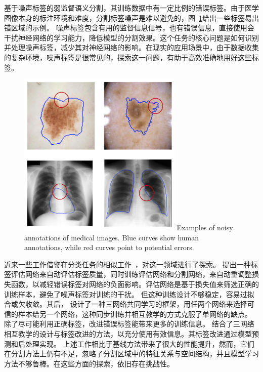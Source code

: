 基于噪声标签的弱监督语义分割，其训练数据中有一定比例的错误标签。由于医学图像本身的标注环境和难度，分割标签噪声是难以避免的，图~\ref{c1_fig3}给出一些标签易出错区域的示例。
噪声标签包含有用的监督信息信号，也有错误信息，直接使用会干扰神经网络的学习能力，降低模型的分割效果。这个任务的核心问题是如何识别并处理噪声标签，减少其对神经网络的影响。在现实的应用场景中，由于数据收集的复杂环境，噪声标签是很常见的，探索这一问题，有助于高效准确地用好这些标签。
    \begin{figure}[tbp]
        \centering 
        \includegraphics[width=0.7\textwidth]{img/c1/intro_3.png}
        {Examples of noisy annotations of medical images. Blue curves show human annotations, while red curves point to potential errors.}
        \label{c1_fig3}
    \end{figure}

近来一些工作借鉴在分类任务的相似工作~\citep{arpit2017closer,Han2018CoteachingRT,Wei2020CombatingNL}，对这一领域进行了探索。
\citet{Zhu2019PickandLearnAQ} 提出一种标签评估网络来自动评估标签质量，同时训练评估网络和分割网络，来自动重调整损失函数，以减轻错误标签对网络的负面影响。评估网络是基于损失值来筛选正确的训练样本，避免了噪声标签对训练的干扰。
但这种训练设计不够稳定，容易过拟合或欠收敛。其后，\citet{Zhang2020RobustMI} 设计了一种三网络共同学习的框架，用任两个网络来选择可信的样本给另一个网络，这种同步训练并相互教学的方式克服了单网络的缺点。
除了尽可能利用正确标签，改进错误标签能带来更多的训练信息。\citet{Xue2020CascadedRL} 结合了三网络相互教学的设计与标签改进的方法，以充分使用有效信息。其标签改进通过模型预测和后处理实现。
上述工作相比于基线方法带来了很大的性能提升，然而，它们在分割方法上仍有不足，忽略了分割区域中的特征关系与空间结构，并且模型学习方法不够鲁棒。在这些方面的探索，依旧存在挑战性。

